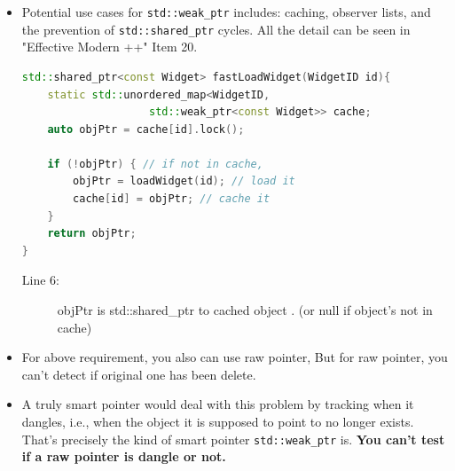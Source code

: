 \documentclass[a4paper,11pt,twoside]{book}
\begin{document}
\begin{itemize}
\item Potential use cases for \texttt{std::weak\_ptr} includes: caching, observer lists, and the prevention of \texttt{std::shared\_ptr} cycles.  All the detail can be seen in "Effective Modern ++" Item 20.
\begin{lstlisting}[frame=single, language=c++]
std::shared_ptr<const Widget> fastLoadWidget(WidgetID id){
	static std::unordered_map<WidgetID, 
	                std::weak_ptr<const Widget>> cache;
	auto objPtr = cache[id].lock();

	if (!objPtr) { // if not in cache,
		objPtr = loadWidget(id); // load it
		cache[id] = objPtr; // cache it
	}
	return objPtr;
}
\end{lstlisting}
\begin{description}
	\item[Line 6:] objPtr is std::shared\_ptr to cached object . (or null if object's not in cache)
\end{description}


\item For above requirement, you also can use raw pointer, But for raw pointer, you can't detect if original one has been delete. 

\item A truly smart pointer would deal with this problem by tracking when it dangles, i.e., when the object it is supposed to point to no longer exists. That's precisely the kind of smart pointer \texttt{std::weak\_ptr} is. \textbf{You can't test if a raw pointer is dangle or not.}
\end{itemize}
\end{document}
